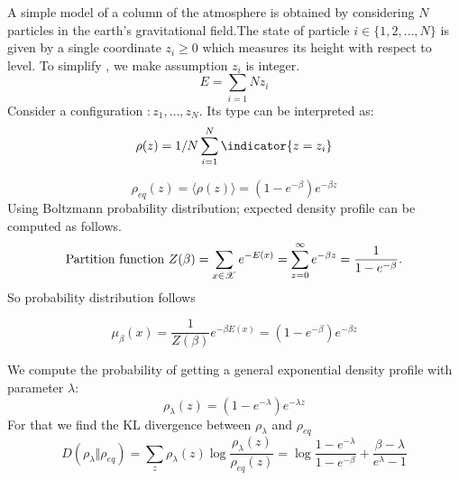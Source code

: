 \documentclass[letterpaper,english,12pt]{article}
\begin{document}
 \begin{exmp}
 
 A simple model of a column of the atmosphere is obtained by considering $N$ particles in the earth's gravitational field.The state of particle $i \in \lbrace 1,2, \dots, N \rbrace $ is given by a single coordinate $z_i\geq 0$ which measures its height with respect to level. To simplify , we make assumption $z_i$ is integer.
 \begin{equation}
     E=\sum_{i=1}{N}z_i
 \end{equation}
 Consider a configuration $:{z_1,\dots,z_N}$. Its type can be interpreted as:
 \begin{equation}
   \rho(z) = \displaystyle 1/N\sum_{i=1}^{N}\indicator{z=z_i}  
 \end{equation}
 
 \begin{equation}
     \rho_{eq}(z)=\langle \rho(z) \rangle = (1-e^{-\beta})e^{-\beta z}
 \end{equation}
 Using Boltzmann probability distribution; expected density profile can be computed as follows.
 \begin{equation}
 \text{Partition function   } \label{pf}
	Z(\beta)= \sum_{x \in \mathscr{X}}^{} e^{-E(x)}
 	=\sum_{z=0}^{\infty} e^{-\beta z} = \frac{1}{1-e^{-\beta}}. 
 \end{equation}
 So probability distribution follows
 
 \begin{equation}
 	\mu_{\beta}(x) = \frac{1}{Z(\beta)}e^{-\beta E(x)} = (1-e^{-\beta})e^{-\beta z}
 \end{equation}
 
 We compute the probability of getting a general exponential density profile with parameter $\lambda$:
 \begin{equation}
 	\rho_{\lambda}(z)= (1-e^{-\lambda})e^{-\lambda z}
 \end{equation}
 For that we find the KL divergence between $\rho_{\lambda}$ and $\rho_{eq}$
 \begin{equation}
     D(\rho_{\lambda} \Vert \rho_{eq}) = 
     \sum_{z}^{} \rho_{\lambda}(z) \log \frac{\rho_{\lambda}(z)}{\rho_{eq}(z)} =     
     \log{  \frac{1-e^{-\lambda}}{1-e^{-\beta}}  + \frac{\beta -\lambda}{e^{\lambda}-1}}
 \end{equation}
 

\end{exmp}
\end{document}
